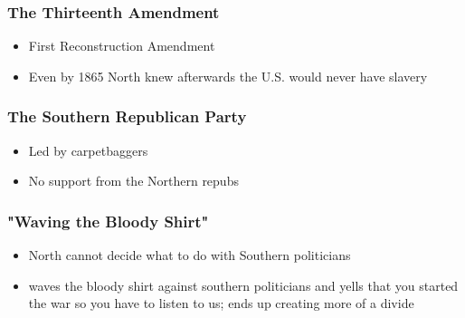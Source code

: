 \documentclass{article}
\begin{document}
\subsubsection{The Thirteenth Amendment}

\begin{itemize}
    \item First Reconstruction Amendment
    \item Even by 1865 North knew afterwards the U.S. would never have slavery
\end{itemize}

\subsubsection{The Southern Republican Party}

\begin{itemize}
    \item Led by carpetbaggers
    \item No support from the Northern repubs
\end{itemize}

\subsubsection{"Waving the Bloody Shirt"}

\begin{itemize}
    \item North cannot decide what to do with Southern politicians
    \item waves the bloody shirt against southern politicians and yells that you started the war so you have to listen to us; ends up creating more of a divide
\end{itemize}
\end{document}
